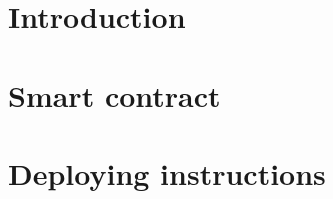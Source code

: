 \documentclass{article}
\begin{document}
\maketitle
\newpage
\tableofcontents
\newpage
\section{Introduction}

\newpage
\section{Smart contract}

\newpage
\section{Deploying instructions}

\end{document}
